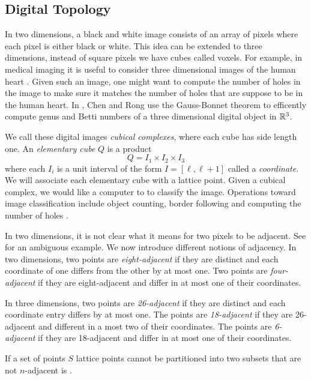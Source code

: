 \subsection{Digital Topology}
\label{sec:digital-topology}

In two dimensions, a black and white image consists of an array of pixels
where each pixel is either black or white.
This idea can be extended to three dimensions,
instead of square pixels we have cubes called voxels.
For example, in medical imaging it is useful to consider
three dimensional images of the human heart \cite{bovik_handbook_2000}.
Given such an image, one might want to compute
the number of holes in the image to make sure it
matches the number of holes that are suppose to be in
the human heart. In \cite{chen_digital_2010}, Chen and Rong 
use the Gauss-Bonnet theorem to efficently
compute genus and Betti numbers of a three dimensional
digital object in $\mathbb{R}^3$. 


We call these digital images \emph{cubical complexes},
where each cube has side length one.
An \emph{elementary cube} $Q$ is a product
$$Q=I_1\times I_2 \times I_3$$
where each $I_i$ is a unit interval of the form $I=[\ell,\ell+1]$
called a \emph{coordinate}.
We will associate each elementary cube with a lattice point.
Given a cubical complex, we would like 
a computer to to classify the image.
Operations toward image classification include
object counting, border following and computing 
the number of holes \cite{kong_digital_1989}.




In two dimensions, it is not clear what it means
for two pixels to be adjacent. See 
for an ambiguous example. 
We now introduce different notions of adjacency.
In two dimensions, two points are \emph{eight-adjacent}
if they are distinct and each coordinate of one differs from
the other by at most one.
Two points are \emph{four-adjacent} if
they are eight-adjacent and differ in at most one of their coordinates.

In three dimensions, two points
are \emph{26-adjacent} if they are distinct and each coordinate 
entry differs by at most one.
The points are \emph{18-adjacent} if they are 26-adjacent
and different in  a most two of their coordinates.
The points are \emph{6-adjacent} if they are 18-adjacent and differ 
in at most one of their coordinates.

If a set of points $S$ lattice points cannot be
partitioned into two subsets that are not
$n$-adjacent is .

